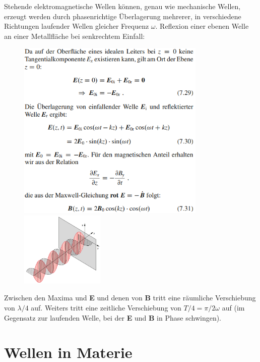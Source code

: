 \documentclass[a4paper, 11pt, parskip=half]{scrartcl}
\begin{document}
Stehende elektromagnetische Wellen können, genau wie mechanische Wellen, erzeugt werden durch
phasenrichtige Überlagerung mehrerer, in verschiedene Richtungen laufender Wellen gleicher Frequenz
$\omega$.
Reflexion einer ebenen Welle an einer Metallfläche bei senkrechtem Einfall:
\begin{figure}[H]
    \centering
    \begin{minipage}[b]{0.3\textwidth}
        \centering
        \includegraphics[width=9cm]{image/13/5.png}
    \end{minipage}
    \hspace{5cm}
    \begin{minipage}[b]{0.3\textwidth}
        \centering
        \includegraphics[width=4cm]{image/13/6.png}
    \end{minipage}
\end{figure}

Zwischen den Maxima und \textbf{E} und denen von \textbf{B} tritt eine räumliche Verschiebung von
$\lambda/4$ auf. Weiters tritt eine zeitliche Verschiebung von $T/4 = \pi / 2 \omega$ auf (im
Gegensatz zur laufenden Welle, bei der \textbf{E} und \textbf{B} in Phase schwingen).

\newpage

\section{Wellen in Materie}
\end{document}
